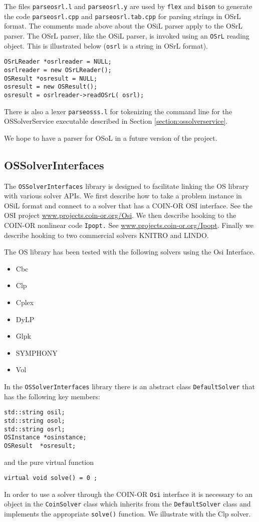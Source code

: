 \documentclass[11pt]{article}
\renewcommand{\_}{{\char"5F}}
\renewcommand{\{}{{\char"7B}}
\renewcommand{\}}{{\char"7D}}
\renewcommand{\^}{{\char"0D}}
\renewcommand{\'}{{\char"0D}}
\begin{document}
The files {\tt parseosrl.l} and {\tt parseosrl.y} are used by {\tt flex} and {\tt bison} to  generate the code {\tt parseosrl.cpp} and {\tt parseosrl.tab.cpp} for parsing strings in OSrL format. The comments made above about the OSiL parser apply to the OSrL parser. The OSrL parser, like the OSiL parser, is invoked using an {\tt OSrL} reading object. This is illustrated below ({\tt osrl} is a string in OSrL format).
\begin{verbatim}
OSrLReader *osrlreader = NULL;
osrlreader = new OSrLReader();
OSResult *osresult = NULL;
osresult = new OSResult(); 
osresult = osrlreader->readOSrL( osrl);
\end{verbatim}

There is also a lexer {\tt parseosss.l} for tokenizing the command line for the OSSolverService executable described in Section \ref{section:ossolverservice}.

We hope to have a parser for OSoL  in a future version of the project. 


\subsection{OSSolverInterfaces}


The {\tt OSSolverInterfaces} library is designed to facilitate linking the OS library with various solver APIs. We first describe how to take a problem instance in OSiL format and connect to a solver that has a COIN-OR OSI interface.  See the OSI project \url{www.projects.coin-or.org/Osi}.   We then describe hooking to the COIN-OR nonlinear code {\tt Ipopt.} See \url{www.projects.coin-or.org/Ipopt}.  Finally we describe hooking to two commercial solvers KNITRO and LINDO. 

The OS library has been tested with the following solvers using the Osi Interface.

\begin{itemize}
\item Cbc
\item Clp
\item Cplex
\item DyLP
\item Glpk
\item SYMPHONY
\item Vol
\end{itemize}

In the {\tt OSSolverInterfaces} library there is an abstract class {\tt DefaultSolver} that has the following key members:

\begin{verbatim}
std::string osil;
std::string osol;
std::string osrl;
OSInstance *osinstance;
OSResult  *osresult;
\end{verbatim}
and the pure virtual function
\begin{verbatim}
virtual void solve() = 0 ;	
\end{verbatim}
In order to use a solver through the COIN-OR {\tt Osi} interface it is necessary to an object in the {\tt CoinSolver} class which inherits from the {\tt DefaultSolver} class and implements the appropriate {\tt solve()} function.  We illustrate with the Clp solver.
\end{document}
